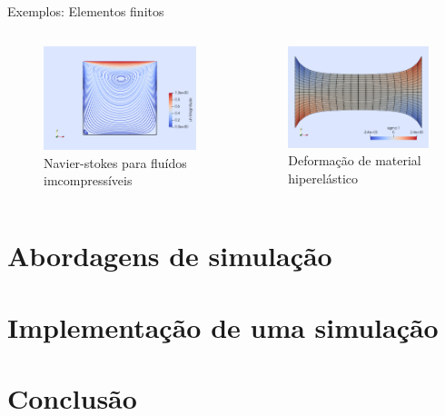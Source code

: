 \documentclass{beamer}
\begin{document}
		\begin{frame}{Exemplos: Elementos finitos}
			\begin{columns}
				\begin{column}{.5\linewidth}
					\begin{figure}
						\includegraphics[width=\linewidth]{navierstokes2d}
						\caption{Navier-stokes para fluídos imcompressíveis}
					\end{figure}
				\end{column}
				\begin{column}{.5\linewidth}
					\begin{figure}
						\includegraphics[width=\linewidth]{neohook}
						\caption{Deformação de material hiperelástico}
					\end{figure}
				\end{column}			
			\end{columns}
		\end{frame}
	\section{Abordagens de simulação}
	\section{Implementação de uma simulação}
	\section{Conclusão}
\end{document}
